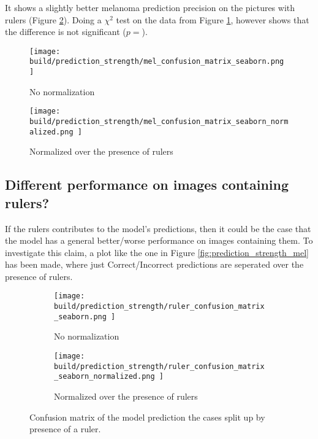 It shows a slightly better melanoma prediction precision on the pictures with rulers (Figure \ref{fig:prediction_strength_mel_normalized}).
Doing a $\chi^2$ test on the data from Figure \ref{fig:prediction_strength_mel_not_normalized},
however shows that the difference is not significant ($p=$).


\begin{center}
    \begin{subfigure}[h]{0.45\textwidth}
        \texttt{[image: 
            build/prediction\_strength/mel\_confusion\_matrix\_seaborn.png
        ]}
        \caption{No normalization}
        \label{fig:prediction_strength_mel_not_normalized}
    \end{subfigure}
    \begin{subfigure}[h]{0.45\textwidth}
        \texttt{[image: 
            build/prediction\_strength/mel\_confusion\_matrix\_seaborn\_normalized.png
        ]}
        \caption{Normalized over the presence of rulers}
        \label{fig:prediction_strength_mel_normalized}
    \end{subfigure}
    \label{fig:prediction_strength_mel}
\end{center}

\subsection{Different performance on images containing rulers?}
If the rulers contributes to the model's predictions,
then it could be the case that the model has a general better/worse performance on images containing them.
To investigate this claim, a plot like the one in Figure \ref{fig:prediction_strength_mel} has been made,
where just Correct/Incorrect predictions are seperated over the presence of rulers.

\begin{figure}
    \centering
    \begin{subfigure}[h]{0.45\textwidth}
        \texttt{[image: 
            build/prediction\_strength/ruler\_confusion\_matrix\_seaborn.png
        ]}
        \caption{No normalization}
        \label{fig:prediction_strength_ruler_not_normalized}
    \end{subfigure}
    \begin{subfigure}[h]{0.45\textwidth}
        \texttt{[image: 
            build/prediction\_strength/ruler\_confusion\_matrix\_seaborn\_normalized.png
        ]}
        \caption{Normalized over the presence of rulers}
        \label{fig:prediction_strength_ruler_normalized}
    \end{subfigure}
    \caption{Confusion matrix of the model prediction the cases split up by presence of a ruler.}
    \label{fig:prediction_strength_ruler}
\end{figure}

